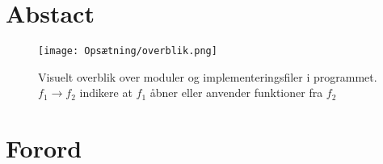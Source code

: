 \documentclass{article}
\newcommand{\newchapter}{
    \cleardoublepage
    \ifthenelse{\isodd{\value{page}}}{}{\hbox{}\newpage}
}
\begin{document}

\pagestyle{plain}

\section{Abstact}

\newpage
\begin{figure}[h]
    \centering
    \texttt{[image: Opsætning/overblik.png]}
    \caption{Visuelt overblik over moduler og implementeringsfiler i programmet. $f_1 \to f_2$ indikere at $f_1$ åbner eller anvender funktioner fra $f_2$}
    \label{fig:svg_example}
\end{figure}

\newchapter
\section{Forord}


\newchapter
\tableofcontents
\newchapter

\newchapter

\newchapter

\newchapter

\newchapter

\newchapter


\newchapter

\newchapter




\newpage
\printbibliography

\newpage

\end{document}
